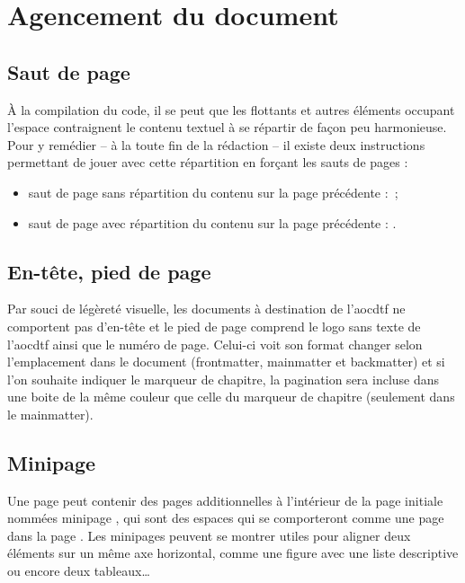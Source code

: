 \documentclass[a4paper, 11pt, twoside, fleqn]{memoir}
\begin{document}
	\section{Agencement du document}
		
		\subsection{Saut de page}
		
		\`A la compilation du code, il se peut que les flottants et autres éléments occupant l'espace contraignent le contenu textuel à se répartir de façon peu harmonieuse. Pour y remédier -- à la toute fin de la rédaction -- il existe deux instructions permettant de \og jouer \fg{} avec cette répartition en forçant les sauts de pages :
		
	\begin{itemize}
	\item saut de page sans répartition du contenu sur la page précédente : \texttt{\newpage}\,;
	\item saut de page avec répartition du contenu sur la page précédente : \texttt{\pagebreak}.
	\end{itemize}

		\subsection{En-tête, pied de page}

Par souci de légèreté visuelle, les documents à destination de l'\gls{aocdtf} ne comportent pas d'en-tête et le pied de page comprend le logo sans texte de l'\gls{aocdtf} ainsi que le numéro de page. Celui-ci voit son format changer selon l'emplacement dans le document (frontmatter, mainmatter et backmatter) et si l'on souhaite indiquer le marqueur de chapitre, la pagination sera incluse dans une boite de la même couleur que celle du marqueur de chapitre (seulement dans le mainmatter).

		\subsection{Minipage}

Une page peut contenir des \og pages \fg{} additionnelles à l'intérieur de la page initiale nommées \og minipage \fg{}, qui sont des espaces qui se comporteront comme une \og page dans la page \fg{}. Les \og minipages \fg{} peuvent se montrer utiles pour aligner deux éléments sur un même axe horizontal, comme une figure avec une liste descriptive ou encore deux tableaux\ldots
\end{document}
